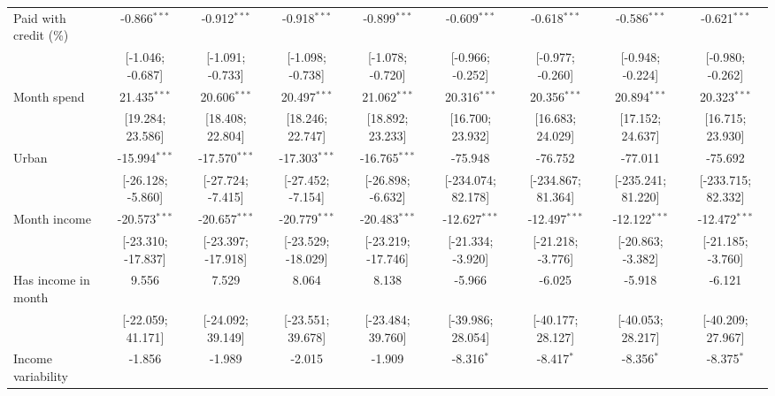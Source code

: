 \begin{table}[htbp]
\begin{threeparttable}[b]
\begin{tabular}{lcccccccc}
         Paid with credit (\%)       & -0.866$^{***}$     & -0.912$^{***}$     & -0.918$^{***}$     & -0.899$^{***}$     & -0.609$^{***}$     & -0.618$^{***}$     & -0.586$^{***}$     & -0.621$^{***}$\\   
                                     & [-1.046; -0.687]   & [-1.091; -0.733]   & [-1.098; -0.738]   & [-1.078; -0.720]   & [-0.966; -0.252]   & [-0.977; -0.260]   & [-0.948; -0.224]   & [-0.980; -0.262]\\   
         Month spend                 & 21.435$^{***}$     & 20.606$^{***}$     & 20.497$^{***}$     & 21.062$^{***}$     & 20.316$^{***}$     & 20.356$^{***}$     & 20.894$^{***}$     & 20.323$^{***}$\\   
                                     & [19.284; 23.586]   & [18.408; 22.804]   & [18.246; 22.747]   & [18.892; 23.233]   & [16.700; 23.932]   & [16.683; 24.029]   & [17.152; 24.637]   & [16.715; 23.930]\\   
         Urban                       & -15.994$^{***}$    & -17.570$^{***}$    & -17.303$^{***}$    & -16.765$^{***}$    & -75.948            & -76.752            & -77.011            & -75.692\\   
                                     & [-26.128; -5.860]  & [-27.724; -7.415]  & [-27.452; -7.154]  & [-26.898; -6.632]  & [-234.074; 82.178] & [-234.867; 81.364] & [-235.241; 81.220] & [-233.715; 82.332]\\   
         Month income                & -20.573$^{***}$    & -20.657$^{***}$    & -20.779$^{***}$    & -20.483$^{***}$    & -12.627$^{***}$    & -12.497$^{***}$    & -12.122$^{***}$    & -12.472$^{***}$\\   
                                     & [-23.310; -17.837] & [-23.397; -17.918] & [-23.529; -18.029] & [-23.219; -17.746] & [-21.334; -3.920]  & [-21.218; -3.776]  & [-20.863; -3.382]  & [-21.185; -3.760]\\   
         Has income in month         & 9.556              & 7.529              & 8.064              & 8.138              & -5.966             & -6.025             & -5.918             & -6.121\\   
                                     & [-22.059; 41.171]  & [-24.092; 39.149]  & [-23.551; 39.678]  & [-23.484; 39.760]  & [-39.986; 28.054]  & [-40.177; 28.127]  & [-40.053; 28.217]  & [-40.209; 27.967]\\   
         Income variability          & -1.856             & -1.989             & -2.015             & -1.909             & -8.316$^{*}$       & -8.417$^{*}$       & -8.356$^{*}$       & -8.375$^{*}$\\   

\end{tabular}
\end{threeparttable}
\end{table}
